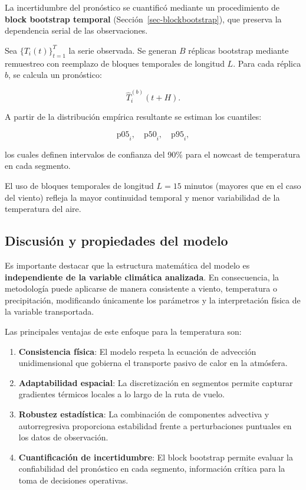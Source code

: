 \documentclass[
  spanish,
  us-letterpaper,
]{scrreprt}
\numberwithin{equation}{section}
\begin{document}
La incertidumbre del pronóstico se cuantificó mediante un procedimiento
de \textbf{block bootstrap temporal} (Sección~\ref{sec-blockbootstrap}),
que preserva la dependencia serial de las observaciones.

Sea \(\{T_i(t)\}_{t=1}^T\) la serie observada. Se generan \(B\) réplicas
bootstrap mediante remuestreo con reemplazo de bloques temporales de
longitud \(L\). Para cada réplica \(b\), se calcula un pronóstico:

\[
\hat{T}_i^{(b)}(t+H).
\]

A partir de la distribución empírica resultante se estiman los
cuantiles:

\[
\text{p05}_i, \quad \text{p50}_i, \quad \text{p95}_i,
\]

los cuales definen intervalos de confianza del 90\% para el nowcast de
temperatura en cada segmento.

El uso de bloques temporales de longitud \(L = 15\) minutos (mayores que
en el caso del viento) refleja la mayor continuidad temporal y menor
variabilidad de la temperatura del aire.

\subsection{Discusión y propiedades del
modelo}\label{discusiuxf3n-y-propiedades-del-modelo}

Es importante destacar que la estructura matemática del modelo es
\textbf{independiente de la variable climática analizada}. En
consecuencia, la metodología puede aplicarse de manera consistente a
viento, temperatura o precipitación, modificando únicamente los
parámetros y la interpretación física de la variable transportada.

Las principales ventajas de este enfoque para la temperatura son:

\begin{enumerate}
\def\labelenumi{\arabic{enumi}.}
\item
  \textbf{Consistencia física}: El modelo respeta la ecuación de
  advección unidimensional que gobierna el transporte pasivo de calor en
  la atmósfera.
\item
  \textbf{Adaptabilidad espacial}: La discretización en segmentos
  permite capturar gradientes térmicos locales a lo largo de la ruta de
  vuelo.
\item
  \textbf{Robustez estadística}: La combinación de componentes advectiva
  y autorregresiva proporciona estabilidad frente a perturbaciones
  puntuales en los datos de observación.
\item
  \textbf{Cuantificación de incertidumbre}: El block bootstrap permite
  evaluar la confiabilidad del pronóstico en cada segmento, información
  crítica para la toma de decisiones operativas.
\end{enumerate}
\end{document}

